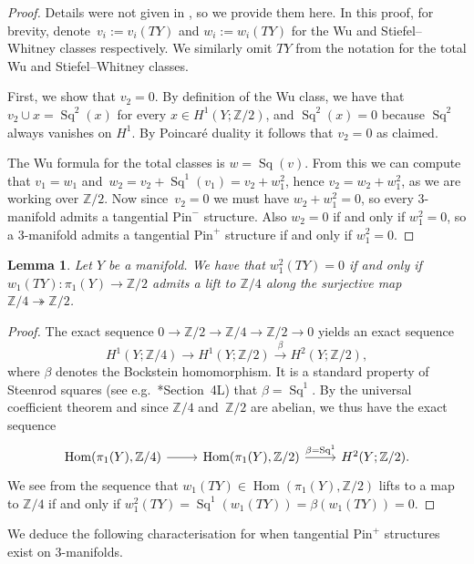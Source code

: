 \documentclass[a4paper, reqno]{amsart}
\newtheorem{lemma}[proposition]{Lemma}
\theoremstyle{definition}
\theoremstyle{remark}
\newcommand{\Z}{\mathbb{Z}}
\newcommand{\pinplus}{{\mathrm{Pin}^+}\!}
\newcommand{\pinminus}{{\mathrm{Pin}^-}}
\newcommand{\onto}{\twoheadrightarrow}
\DeclareMathOperator{\Sq}{Sq}
\DeclareMathOperator{\Hom}{Hom}
\begin{document}
\begin{proof}
Details were not given in \cite{kirby-taylor:pin}, so we provide them here. In this proof, for brevity, denote~$v_i:=v_i(TY)$ and $w_i:=w_i(TY)$ for the Wu and Stiefel--Whitney classes respectively. We similarly omit $TY$ from the notation for the total Wu and Stiefel--Whitney classes.

First, we show that $v_2=0$. By definition of the Wu class, we have that $v_2 \cup x = \Sq^2(x)$ for every $x \in H^1(Y;\Z/2)$, and $\Sq^2(x) =0$ because $\Sq^2$ always vanishes on $H^1$. By Poincar\'{e} duality it follows that $v_2=0$ as claimed.  

The Wu formula for the total classes is $w = \Sq(v)$. From this we can compute that $v_1=w_1$ and~$w_2 = v_2 + \Sq^1 (v_1) = v_2 + w_1^2$, hence $v_2 = w_2 + w_1^2$, as we are working over $\Z/2$.  Now since~$v_2=0$ we must have $w_2 + w_1^2=0$, so every 3-manifold admits a tangential $\pinminus$ structure. Also $w_2=0$ if and only if $w_1^2=0$, so a 3-manifold admits a tangential $\pinplus$ 
structure if and only if $w_1^2=0$. 
\end{proof}


\begin{lemma}\label{lemma:w_1-squared-zero-iff-Z4-lift}
Let $Y$ be a manifold. 
We have that $w_1^2(TY)=0$
if and only if $w_1(TY)\colon \pi_1(Y)\to \Z/2$ admits a lift to $\Z/4$ along the surjective map $\Z/4\onto \Z/2$.    
\end{lemma}

\begin{proof}
The exact sequence $0 \to \Z/2\to \Z/4\to \Z/2 \to 0$ yields an exact sequence 
\[H^1(Y;\Z/4)\to H^1(Y;\Z/2)\xrightarrow{\beta} H^2(Y;\Z/2),\] 
where $\beta$ denotes the Bockstein homomorphism. It is a standard property of Steenrod squares (see e.g.~\cite{hatcher-AT}*{Section~4L}) that $\beta=\Sq^1$. By the universal coefficient theorem and since $\Z/4$ and~$\Z/2$ are abelian, we thus have the exact sequence 
\[
\begin{tikzcd}
    \Hom(\pi_1(Y),\Z/4)\ar[r]   &\Hom(\pi_1(Y),\Z/2)\ar[r,"\beta=\Sq^1"]  &H^2(Y;\Z/2).
\end{tikzcd}
\]
We see from the sequence that $w_1(TY)\in \Hom(\pi_1(Y),\Z/2)$ lifts to a map to $\Z/4$ if and only if $w_1^2(TY)=\Sq^1(w_1(TY))=\beta(w_1(TY))=0$.
\end{proof}

We deduce the following characterisation for when tangential $\pinplus$ structures exist on $3$-manifolds.
\end{document}
